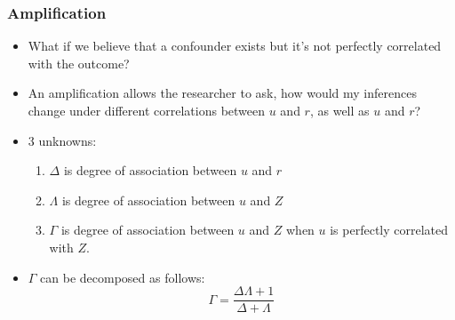 \documentclass{beamer}
\begin{document}
\begin{frame}[c]\frametitle{Amplification}
	\begin{itemize}
		\item<+-> 	What if we believe that a confounder exists but it's not perfectly correlated with the outcome? 
		\item<+-> An amplification allows the researcher to ask, how would my inferences change under different correlations between $u$ and $r$, as well as $u$ and $r$?
		\item<+-> 3 unknowns:
		\begin{enumerate}
			\item<+-> $\Delta$ is degree of association between $u$ and $r$
			\item<+-> $\Lambda$ is degree of association between $u$ and $Z$
			\item<+-> $\Gamma$ is degree of association between $u$ and $Z$ when $u$ is perfectly correlated with $Z$.   
		\end{enumerate}
		\item<+-> $\Gamma$ can be decomposed as follows:
		$$\Gamma = \frac{\Delta \Lambda + 1}{\Delta + \Lambda}$$
	\end{itemize}
 
	
\end{frame}
\end{document}
